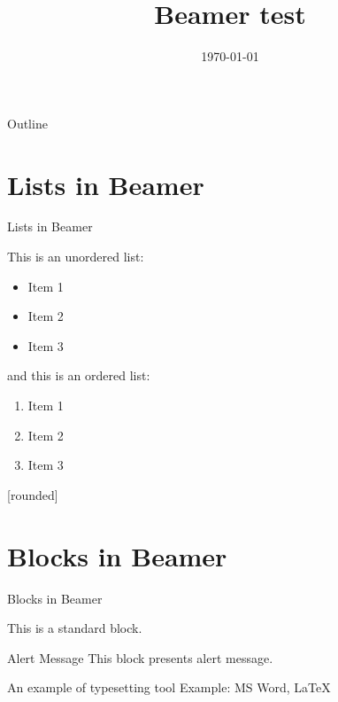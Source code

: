 \documentclass{beamer}
\title{Beamer test}
\date{\today}
\begin{document}
\begin{frame}
    \titlepage 
\end{frame}

\logo{}


\begin{frame}{Outline}
    \tableofcontents
\end{frame}


\section{Lists in Beamer}
\begin{frame}{Lists in Beamer}

This is an unordered list:
\begin{itemize}
    \item Item 1
    \item Item 2
    \item Item 3
\end{itemize}

and this is an ordered list:
\begin{enumerate}
    \item Item 1
    \item Item 2
    \item Item 3
\end{enumerate}

\end{frame}

[rounded]
\section{Blocks in Beamer}
\begin{frame}{Blocks in Beamer}
    \begin{block}{ }
        This is a standard block.
    \end{block}
    \begin{alertblock}{Alert Message}
        This block presents alert message.
    \end{alertblock}
    \begin{exampleblock}{An example of typesetting tool}
        Example: MS Word, \LaTeX{}
    \end{exampleblock}
\end{frame} 
\end{document}
